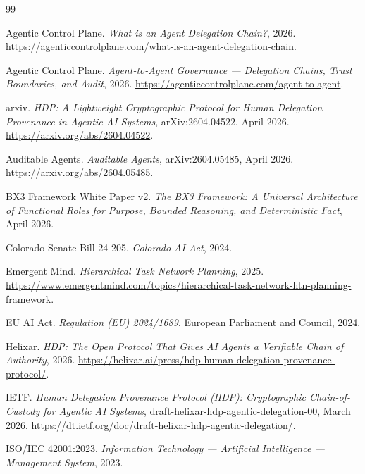 \begin{thebibliography}{99}


\item Agentic Control Plane. \emph{What is an Agent Delegation Chain?}, 2026. \url{https://agenticcontrolplane.com/what-is-an-agent-delegation-chain}.

\item Agentic Control Plane. \emph{Agent-to-Agent Governance — Delegation Chains, Trust Boundaries, and Audit}, 2026. \url{https://agenticcontrolplane.com/agent-to-agent}.

\item arxiv. \emph{HDP: A Lightweight Cryptographic Protocol for Human Delegation Provenance in Agentic AI Systems}, arXiv:2604.04522, April 2026. \url{https://arxiv.org/abs/2604.04522}.

\item Auditable Agents. \emph{Auditable Agents}, arXiv:2604.05485, April 2026. \url{https://arxiv.org/abs/2604.05485}.

\item BX3 Framework White Paper v2. \emph{The BX3 Framework: A Universal Architecture of Functional Roles for Purpose, Bounded Reasoning, and Deterministic Fact}, April 2026.

\item Colorado Senate Bill 24-205. \emph{Colorado AI Act}, 2024.

\item Emergent Mind. \emph{Hierarchical Task Network Planning}, 2025. \url{https://www.emergentmind.com/topics/hierarchical-task-network-htn-planning-framework}.

\item EU AI Act. \emph{Regulation (EU) 2024/1689}, European Parliament and Council, 2024.

\item Helixar. \emph{HDP: The Open Protocol That Gives AI Agents a Verifiable Chain of Authority}, 2026. \url{https://helixar.ai/press/hdp-human-delegation-provenance-protocol/}.

\item IETF. \emph{Human Delegation Provenance Protocol (HDP): Cryptographic Chain-of-Custody for Agentic AI Systems}, draft-helixar-hdp-agentic-delegation-00, March 2026. \url{https://dt.ietf.org/doc/draft-helixar-hdp-agentic-delegation/}.

\item ISO/IEC 42001:2023. \emph{Information Technology — Artificial Intelligence — Management System}, 2023.


\end{thebibliography}
